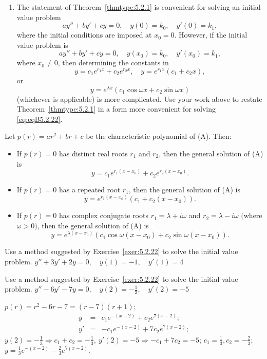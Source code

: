 \documentclass{ximera}
\begin{document}
\begin{problem}
\begin{enumerate}
\item %
The statement of
 Theorem~\ref{thmtype:5.2.1}  is convenient for solving an
initial value problem
$$
ay''+by'+cy=0, \quad  y(0)=k_0,\quad y'(0)=k_1,
$$
where the initial conditions are imposed at $x_0=0$.
However, if the  initial value problem is \begin{equation}\label{eq:eqB5.2.22}
ay''+by'+cy=0, \quad  y(x_0)=k_0,\quad y'(x_0)=k_1,
\end{equation}
where $x_0\ne0$, then  determining  the constants in
$$
y=c_1e^{r_1x}+c_2e^{r_2x}, \quad  y=e^{r_1x}(c_1+c_2x),$$
or
$$y=e^{\lambda x}(c_1\cos\omega x+c_2\sin\omega x)
$$
(whichever is applicable) is more complicated. Use your work above to restate
Theorem~\ref{thmtype:5.2.1} in a form more convenient for solving
\ref{eq:eqB5.2.22}.
\end{enumerate}
\begin{solution}
Let $p(r)=ar^2+br+c$ be the characteristic polynomial of {\rm(A)}.
Then:
\begin{itemize}
\item
If $p(r)=0$  has distinct real roots $r_1$ and $r_2$, then the general
solution of {\rm(A)} is
$$
y=c_1e^{r_1(x-x_0)}+c_2e^{r_2(x-x_0)}.
$$
\item
If $p(r)=0$  has a repeated root  $r_1$, then
the general solution of {\rm(A)} is
$$
y=e^{r_1(x-x_0)}(c_1+c_2(x-x_0)).
$$
\item %
If $p(r)=0$  has complex conjugate roots $r_1=\lambda+i\omega$
and
$r_2=\lambda-i\omega$ $($where $\omega>0)$, then the general solution
of {\rm(A)} is
$$
y=e^{\lambda (x-x_0)}(c_1\cos\omega(x-x_0)+c_2\sin\omega(x-x_0)).
$$
\end{itemize}
\end{solution}
\end{problem}

\begin{problem}\label{exer:5.2.23}  Use a method
suggested by Exercise~\ref{exer:5.2.22} to solve the initial value
problem.
$y''+3y'+2y=0, \quad  y(1)=-1,\quad y'(1)=4$
\end{problem}

\begin{problem}\label{exer:5.2.24}  Use a method
suggested by Exercise~\ref{exer:5.2.22} to solve the initial value
problem.
$y''-6y'-7y=0, \quad  y(2)=-\frac{1}{3},\quad y'(2)=-5$
\begin{solution}
$p(r)=r^2-6r-7=(r-7)(r+1)$;
\begin{eqnarray*}
y&=&c_1e^{-(x-2)}+c_2e^{7(x-2)};\\
y'&=&-c_1e^{-(x-2)}+7c_2e^{7(x-2)};
\end{eqnarray*}
$y(2)=-\frac{1}{3}\Rightarrow c_1+c_2=-\frac{1}{3},\
y'(2)=-5\Rightarrow -c_1+7c_2=-5$;\;
$c_1=\frac{1}{3}, c_2=-\frac{2}{3}$;\;
$y=\frac{1}{3}e^{-(x-2)}-\frac{2}{3}e^{7(x-2)}$.
\end{solution}
\end{problem}
\end{document}
